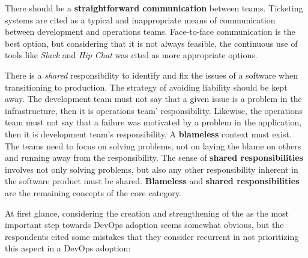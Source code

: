 There should be a \textbf{straightforward communication} between teams. Ticketing
systems are cited as a typical and inappropriate means of communication
between development and operations teams. Face-to-face communication is the best
option, but considering that it is not always feasible, the continuous use of
tools like \emph{Slack} and \emph{Hip Chat} was cited as more appropriate options.


There is a \emph{shared} responsibility to identify and fix the issues
of a software when transitioning to production. The strategy of avoiding liability should be kept away.
The development team must not say that a given issue is a problem in the infrastructure, then
it is operations team' responsibility. Likewise, the operations team
must not say that a failure was motivated by a problem in the application, then it is
development team's responsibility. A \textbf{blameless} context must exist.
The teams need to focus on solving problems, not on laying the blame on others
and running away from the responsibility. The sense of \textbf{shared
responsibilities} involves not only solving problems, but also any other
responsibility inherent in the software product must be shared.
\textbf{Blameless} and \textbf{shared responsibilities} are the remaining
concepts of the core category.


At first glance, considering the creation and strengthening of the \cc as the
most important step towards DevOps adoption seems somewhat obvious, but
the respondents cited some mistakes that they consider recurrent in not
prioritizing this aspect in a DevOps adoption:


